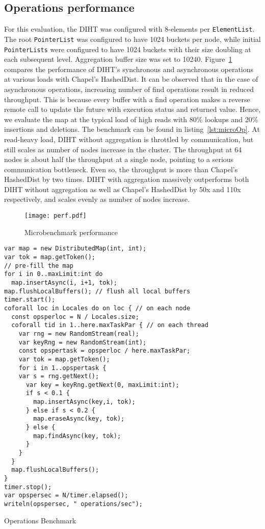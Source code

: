 \documentclass[letterpaper, 10 pt, conference]{ieeeconf}  %
\begin{document}
\subsection{Operations performance}
For this evaluation, the DIHT was configured with 8-elements per \texttt{ElementList}. The root \texttt{PointerList} was configured to have 1024 buckets per node, while initial \texttt{PointerLists} were configured to have 1024 buckets with their size doubling at each subsequent level. Aggregation buffer size was set to 10240. Figure~\ref{fig:perf} compares the performance of DIHT's synchronous and asynchronous operations at various loads with Chapel's HashedDist. It can be observed that in the case of asynchronous operations, increasing number of find operations result in reduced throughput. This is because every buffer with a find operation makes a reverse remote call to update the future with execution status and returned value. Hence, we evaluate the map at the typical load of high reads with 80\% lookups and 20\% insertions and deletions. The benchmark can be found in listing~\ref{lst:microOp}. At read-heavy load,  DIHT without aggregation is throttled by communication, but still scales as number of nodes increase in the cluster. The throughput at 64 nodes is about half the throughput at a single node, pointing to a serious communication bottleneck. Even so, the throughput is more than Chapel's HashedDist by two times. DIHT with aggregation massively outperforms both DIHT without aggregation as well as Chapel's HashedDist by 50x and 110x respectively, and scales evenly as number of nodes increase.

\begin{figure}
    \centering
    \texttt{[image: perf.pdf]}
    \caption{Microbenchmark performance}
  \label{fig:perf}
\end{figure}

\begin{listing}
\begin{verbatim}
var map = new DistributedMap(int, int);
var tok = map.getToken();
// pre-fill the map
for i in 0..maxLimit:int do
  map.insertAsync(i, i+1, tok);
map.flushLocalBuffers(); // flush all local buffers
timer.start();
coforall loc in Locales do on loc { // on each node
  const opsperloc = N / Locales.size;
  coforall tid in 1..here.maxTaskPar { // on each thread
    var rng = new RandomStream(real);
    var keyRng = new RandomStream(int);
    const opspertask = opsperloc / here.maxTaskPar;
    var tok = map.getToken();
    for i in 1..opspertask {
    var s = rng.getNext();
      var key = keyRng.getNext(0, maxLimit:int);
      if s < 0.1 {
        map.insertAsync(key,i, tok);
      } else if s < 0.2 {
        map.eraseAsync(key, tok);
      } else {
        map.findAsync(key, tok);
      }
    }
  }
  map.flushLocalBuffers();
}
timer.stop();
var opspersec = N/timer.elapsed();
writeln(opspersec, " operations/sec");
\end{verbatim}
\caption{Operations Benchmark}
\label{lst:microOp}
\end{listing}
\end{document}
